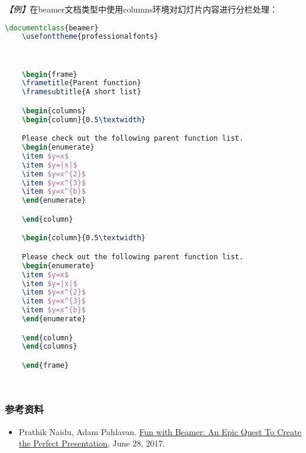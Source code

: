 \emph{【例】}在beamer文档类型中使用columns环境对幻灯片内容进行分栏处理：
\begin{lstlisting}[language=TeX]
    \documentclass{beamer}
    \usefonttheme{professionalfonts}

    

    \begin{frame}
    \frametitle{Parent function}
    \framesubtitle{A short list}

    \begin{columns}
    \begin{column}{0.5\textwidth}

    Please check out the following parent function list.
    \begin{enumerate}
    \item $y=x$
    \item $y=|x|$
    \item $y=x^{2}$
    \item $y=x^{3}$
    \item $y=x^{b}$
    \end{enumerate}

    \end{column}

    \begin{column}{0.5\textwidth}

    Please check out the following parent function list.
    \begin{enumerate}
    \item $y=x$
    \item $y=|x|$
    \item $y=x^{2}$
    \item $y=x^{3}$
    \item $y=x^{b}$
    \end{enumerate}

    \end{column}
    \end{columns}

    \end{frame}

    
\end{lstlisting}

\subsubsection{参考资料}
\begin{itemize}
    \item Prathik Naidu, Adam Pahlavan.
          \href{http://web.mit.edu/rsi/www/pdfs/beamer-tutorial.pdf}{Fun with
              Beamer: An Epic Quest To Create the Perfect Presentation}, June 28,
          2017.
\end{itemize}